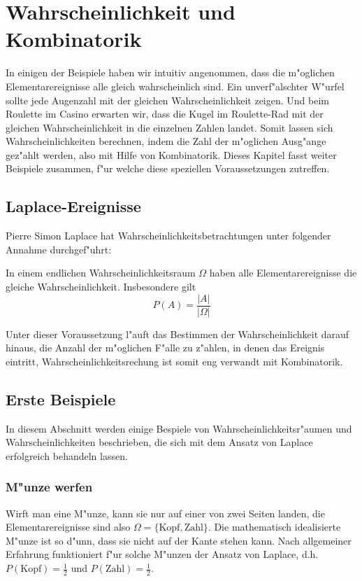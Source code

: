 %
%
%
\chapter{Wahrscheinlichkeit und Kombinatorik
\label{chapter-wahrscheinlichkeit-und-kombinatorik}}
In einigen der Beispiele haben wir intuitiv angenommen, dass
die m"oglichen
Elementarereignisse alle gleich wahrscheinlich sind. Ein unverf"alschter W"urfel
sollte jede Augenzahl mit der gleichen Wahrscheinlichkeit zeigen. Und beim
Roulette im Casino erwarten wir, dass die Kugel im Roulette-Rad mit der gleichen
Wahrscheinlichkeit in die einzelnen Zahlen landet. Somit lassen sich
Wahrscheinlichkeiten berechnen, indem die Zahl der m"oglichen Ausg"ange
gez"ahlt werden, also mit Hilfe von Kombinatorik.
Dieses Kapitel fasst weiter Beispiele zusammen, f"ur welche diese
speziellen Voraussetzungen zutreffen.

\section{Laplace-Ereignisse\label{section-laplace-ereignisse}}
Pierre Simon Laplace hat Wahrscheinlichkeitsbetrachtungen unter folgender
Annahme durchgef"uhrt:
\begin{annahme}In einem endlichen Wahrscheinlichkeitsraum $\Omega$ haben
alle Elementarereignisse die gleiche Wahrscheinlichkeit. Insbesondere
gilt
\[
P(A) = \frac{|A|}{|\Omega|}
\]
\end{annahme}
Unter dieser Voraussetzung l"auft das Bestimmen der Wahrscheinlichkeit
darauf hinaus, die Anzahl der m"oglichen F"alle zu z"ahlen, in denen
das Ereignis eintritt, Wahrscheinlichkeitsrechung ist somit eng verwandt
mit Kombinatorik.

\section{Erste Beispiele}
In diesem Abschnitt werden einige Bespiele von Wahrscheinlichkeitsr"aumen
und Wahrscheinlichkeiten beschrieben, die sich mit dem Ansatz von Laplace
erfolgreich behandeln lassen.

\subsection{M"unze werfen}
Wirft man eine M"unze, kann sie nur auf einer von zwei Seiten landen,
die Elementarereignisse sind also $\Omega = \{\text{Kopf}, \text{Zahl}\}$.
Die mathematisch idealisierte M"unze ist so d"unn, dass sie nicht auf
der Kante stehen kann. Nach allgemeiner Erfahrung funktioniert f"ur
solche M"unzen der Ansatz von Laplace, d.h. $P(\text{Kopf}) = \frac12$
und $P(\text{Zahl})=\frac12$.

